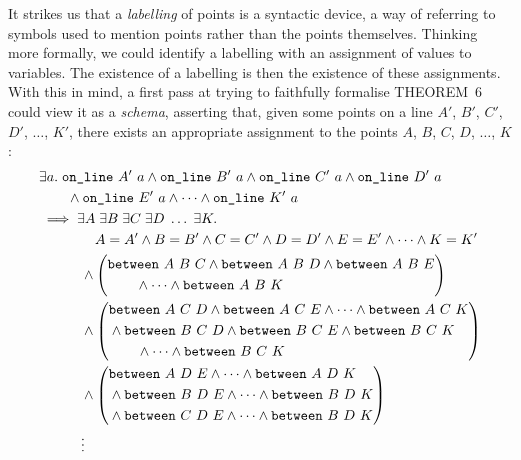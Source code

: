 It strikes us that a \emph{labelling} of points is a syntactic device, a way of referring to symbols used to mention points rather than the points themselves. Thinking more formally, we could identify a labelling with an assignment of values to variables. The existence of a labelling is then the existence of these assignments. With this in mind, a first pass at trying to faithfully formalise THEOREM~6 could view it as a \emph{schema}, asserting that, given some points on a line $A'$, $B'$, $C'$, $D'$, $\ldots$, $K'$, there exists an appropriate assignment to the points $A$, $B$, $C$, $D$, $\ldots$, $K$:
\begin{equation*}
  \begin{split}
    &\exists a.\;\code{on\_line}\ A'\ a\wedge\code{on\_line}\ B'\ a\wedge\code{on\_line}\ C'\ a\wedge\code{on\_line}\ D'\ a\\
    &\qquad\wedge\code{on\_line}\ E'\ a\wedge\cdots\wedge\code{on\_line}\ K'\ a\\
    &\implies\exists A\;\exists B\;\exists C\;\exists D\; \ldots\;\exists K.\; \\
    &\qquad\qquad A = A' \wedge B = B' \wedge C = C' \wedge D = D' \wedge E = E' \wedge \cdots \wedge K = K'\\
    &\qquad\quad\wedge\left(\begin{split}&\between{A}{B}{C} \wedge \between{A}{B}{D} \wedge \between{A}{B}{E} \\ &\qquad\wedge\cdots \wedge \between{A}{B}{K}\end{split}\right) \\
    &\qquad\quad\wedge
    \left(\begin{split}&\between{A}{C}{D} \wedge \between{A}{C}{E} \wedge \cdots \wedge \between{A}{C}{K}\\
        &\wedge\between{B}{C}{D} \wedge \between{B}{C}{E} \wedge \between{B}{C}{K}\\
        &\qquad\wedge \cdots \wedge \between{B}{C}{K}
      \end{split}\right)\\  
    &\qquad\quad\wedge
    \left(\begin{split}&\between{A}{D}{E} \wedge \cdots \wedge \between{A}{D}{K} \\
        &\wedge\between{B}{D}{E} \wedge \cdots \wedge \between{B}{D}{K} \\
        &\wedge\between{C}{D}{E} \wedge \cdots \wedge \between{B}{D}{K}
        \end{split}\right)\\
    &\qquad\quad\vdots
  \end{split}
\end{equation*}


